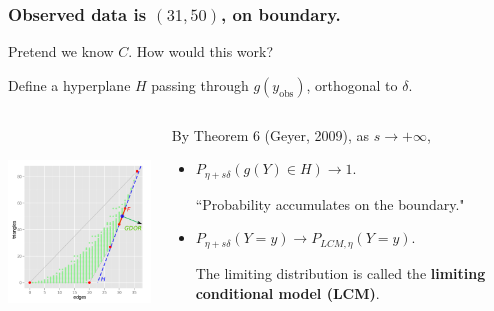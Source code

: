 \documentclass[ 10pt]{beamer}
\newcommand{\yobs}{y_{\text{obs}}}
\begin{document}
\frame
{
	\frametitle{Observed data is $(31,50)$, on boundary.}
Pretend we know $C$.  How would this work?
\vspace{2mm}

Define a hyperplane $H$ passing through $g(\yobs)$, orthogonal to $\delta$.
\begin{columns}[]
\begin{column}[T]{0.43\textwidth}
\includegraphics[height=2.2in]{g9-H.png}
\end{column}
\begin{column}[t]{0.57\textwidth}

\pause
By Theorem 6 (Geyer, 2009), as $s \to +\infty$,
\vspace{1mm}
\begin{itemize}
\item $P_{\eta + s \delta}( g(Y) \in H) \to 1.$
\vspace{1mm}

``Probability accumulates on the boundary."
\vspace{3mm}

\pause
\item $P_{\eta + s \delta}( Y = y) \to P_{LCM, \eta}( Y = y)$.
\vspace{1mm}

The limiting distribution is called the \textbf{limiting conditional model (LCM)}.
\end{itemize}
\end{column}
\end{columns}
}
\end{document}
